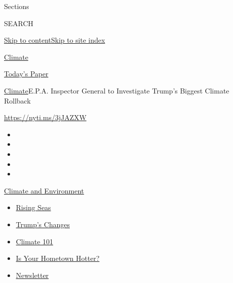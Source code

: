 Sections

SEARCH

\protect\hyperlink{site-content}{Skip to
content}\protect\hyperlink{site-index}{Skip to site index}

\href{https://www.nytimes3xbfgragh.onion/section/climate}{Climate}

\href{https://myaccount.nytimes3xbfgragh.onion/auth/login?response_type=cookie\&client_id=vi}{}

\href{https://www.nytimes3xbfgragh.onion/section/todayspaper}{Today's
Paper}

\href{/section/climate}{Climate}\textbar{}E.P.A. Inspector General to
Investigate Trump's Biggest Climate Rollback

\href{https://nyti.ms/3jJAZXW}{https://nyti.ms/3jJAZXW}

\begin{itemize}
\item
\item
\item
\item
\item
\end{itemize}

\href{https://www.nytimes3xbfgragh.onion/section/climate?action=click\&pgtype=Article\&state=default\&region=TOP_BANNER\&context=storylines_menu}{Climate
and Environment}

\begin{itemize}
\tightlist
\item
  \href{https://www.nytimes3xbfgragh.onion/2020/07/30/climate/sea-level-inland-floods.html?action=click\&pgtype=Article\&state=default\&region=TOP_BANNER\&context=storylines_menu}{Rising
  Seas}
\item
  \href{https://www.nytimes3xbfgragh.onion/interactive/2020/climate/trump-environment-rollbacks.html?action=click\&pgtype=Article\&state=default\&region=TOP_BANNER\&context=storylines_menu}{Trump's
  Changes}
\item
  \href{https://www.nytimes3xbfgragh.onion/interactive/2020/04/19/climate/climate-crash-course-1.html?action=click\&pgtype=Article\&state=default\&region=TOP_BANNER\&context=storylines_menu}{Climate
  101}
\item
  \href{https://www.nytimes3xbfgragh.onion/interactive/2018/08/30/climate/how-much-hotter-is-your-hometown.html?action=click\&pgtype=Article\&state=default\&region=TOP_BANNER\&context=storylines_menu}{Is
  Your Hometown Hotter?}
\item
  \href{https://www.nytimes3xbfgragh.onion/newsletters/climate-change?action=click\&pgtype=Article\&state=default\&region=TOP_BANNER\&context=storylines_menu}{Newsletter}
\end{itemize}

